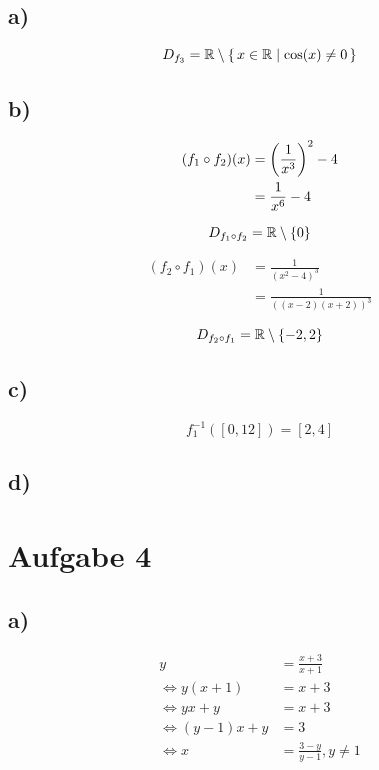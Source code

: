 \documentclass[a4paper, 11pt]{article}
\begin{document}
\subsection{a)}
\label{sec:orgf708129}
$$ D_{f_3} = \mathbb{R} \setminus \set{x \in \mathbb{R}| \cos(x) \neq 0} $$

\subsection{b)}
\label{sec:org0ef0291}
\begin{align*}
    (f_1 \circ f_2)(x) &= \left(\frac{1}{x^3}\right)^2 - 4 \\
    &= \frac{1}{x^6} - 4
\end{align*}

$$ D_{f_1 \circ f_2} = \mathbb{R} \setminus \{0\} $$

\begin{align*}
    (f_2 \circ f_1)(x) &= \frac{1}{(x^2 - 4)^3} \\
    &= \frac{1}{((x - 2)(x + 2))^3}
\end{align*}

$$ D_{f_2 \circ f_1} = \mathbb{R} \setminus \{-2, 2\} $$

\subsection{c)}
\label{sec:org659bbbf}
$$ f_{1}^{-1}([0, 12]) = [2, 4] $$

\subsection{d)}
\label{sec:orgac0a33c}
\section{Aufgabe 4}
\label{sec:org0116150}
\subsection{a)}
\label{sec:org122635b}
\begin{align*}
    y &= \frac{x+3}{x+1} \\
    \Leftrightarrow y(x+1) &= x+3 \\
    \Leftrightarrow yx+y &= x+3 \\
    \Leftrightarrow (y-1)x+y &= 3 \\
    \Leftrightarrow x &= \frac{3-y}{y-1}, y \neq 1 \\
\end{align*}
\end{document}
